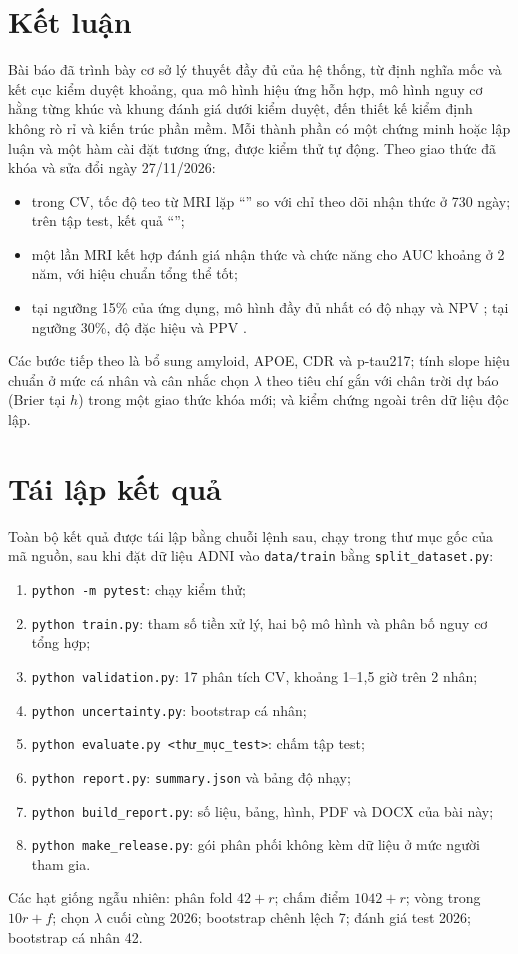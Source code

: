 \documentclass[journal]{IEEEtran}
\newcommand{\code}[1]{\texttt{#1}}
\begin{document}
\section{Kết luận}
Bài báo đã trình bày cơ sở lý thuyết đầy đủ của hệ thống, từ định nghĩa mốc và kết cục kiểm duyệt khoảng, qua mô hình hiệu ứng hỗn hợp, mô hình nguy cơ hằng từng khúc và khung đánh giá dưới kiểm duyệt, đến thiết kế kiểm định không rò rỉ và kiến trúc phần mềm. Mỗi thành phần có một chứng minh hoặc lập luận và một hàm cài đặt tương ứng, được kiểm thử tự động. Theo giao thức đã khóa và sửa đổi ngày 27/11/2026:
\begin{itemize}
\item trong CV, tốc độ teo từ MRI lặp ``'' so với chỉ theo dõi nhận thức ở 730 ngày; trên tập test, kết quả ``'';
\item một lần MRI kết hợp đánh giá nhận thức và chức năng cho AUC khoảng  ở 2 năm, với hiệu chuẩn tổng thể tốt;
\item tại ngưỡng 15\% của ứng dụng, mô hình đầy đủ nhất có độ nhạy  và NPV ; tại ngưỡng 30\%, độ đặc hiệu  và PPV .
\end{itemize}
Các bước tiếp theo là bổ sung amyloid, APOE, CDR và p-tau217; tính slope hiệu chuẩn ở mức cá nhân và cân nhắc chọn $\lambda$ theo tiêu chí gắn với chân trời dự báo (Brier tại $h$) trong một giao thức khóa mới; và kiểm chứng ngoài trên dữ liệu độc lập.

\appendices
\section{Tái lập kết quả}
Toàn bộ kết quả được tái lập bằng chuỗi lệnh sau, chạy trong thư mục gốc của mã nguồn, sau khi đặt dữ liệu ADNI vào \code{data/train} bằng \code{split\_dataset.py}:
\begin{enumerate}
\item \code{python -m pytest}: chạy  kiểm thử;
\item \code{python train.py}: tham số tiền xử lý, hai bộ mô hình và phân bố nguy cơ tổng hợp;
\item \code{python validation.py}: 17 phân tích CV, khoảng 1--1,5 giờ trên 2 nhân;
\item \code{python uncertainty.py}: bootstrap cá nhân;
\item \code{python evaluate.py <thư\_mục\_test>}: chấm tập test;
\item \code{python report.py}: \code{summary.json} và bảng độ nhạy;
\item \code{python build\_report.py}: số liệu, bảng, hình, PDF và DOCX của bài này;
\item \code{python make\_release.py}: gói phân phối không kèm dữ liệu ở mức người tham gia.
\end{enumerate}
Các hạt giống ngẫu nhiên: phân fold $42+r$; chấm điểm $1042+r$; vòng trong $10r+f$; chọn $\lambda$ cuối cùng 2026; bootstrap chênh lệch 7; đánh giá test 2026; bootstrap cá nhân 42.
\end{document}
